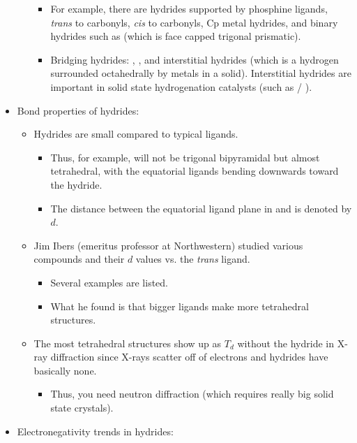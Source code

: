 \documentclass[../notes.tex]{subfiles}
\begin{document}
\begin{itemize}
\begin{itemize}
        \begin{itemize}
            \item For example, there are hydrides supported by phosphine ligands, \emph{trans} to carbonyls, \emph{cis} to carbonyls, Cp metal hydrides, and binary hydrides such as  (which is face capped trigonal prismatic).
            \item Bridging hydrides: , , and interstitial hydrides (which is a hydrogen surrounded octahedrally by metals in a solid). Interstitial hydrides are important in solid state hydrogenation catalysts (such as  / ).
        \end{itemize}
    \end{itemize}
    \item Bond properties of hydrides:
    \begin{itemize}
        \item Hydrides are small compared to typical ligands.
        \begin{itemize}
            \item Thus, for example,  will not be trigonal bipyramidal but almost tetrahedral, with the equatorial ligands bending downwards toward the hydride.
            \item The distance between the equatorial ligand plane in  and  is denoted by $d$.
        \end{itemize}
        \item Jim Ibers (emeritus professor at Northwestern) studied various compounds and their $d$ values vs. the \emph{trans} ligand.
        \begin{itemize}
            \item Several examples are listed.
            \item What he found is that bigger ligands make more tetrahedral structures.
        \end{itemize}
        \item The most tetrahedral structures show up as $T_d$ without the hydride in X-ray diffraction since X-rays scatter off of electrons and hydrides have basically none.
        \begin{itemize}
            \item Thus, you need neutron diffraction (which requires really big solid state crystals).
        \end{itemize}
    \end{itemize}
    \item Electronegativity trends in hydrides:

\end{itemize}
\end{document}
